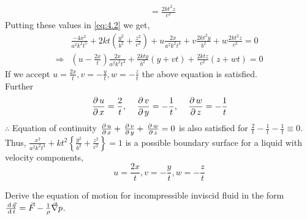 \documentclass[12pt]{article}
\begin{document}
\begin{soln}
\begin{align*}
        &=\frac{2kt^2z}{c^2}
    \end{align*}
    Putting these values in \eqref{eq:4.2} we get,
    \begin{align*}
        & \frac{-4 x^2}{a^2 k^2t^5}+2kt\left( \frac{y^2}{b^2}+\frac{z^2}{c^2} \right)+u \frac{2x}{a^2k^2t^4}+v \frac{2kt^2y}{b^2}+w\frac{2kt^2z}{c^2}=0\\
        \Rightarrow & \left( u-\frac{2x}{t} \right)\frac{2x}{a^2k^2t^4}+\frac{2kty}{b^2}(y+vt)+\frac{2ktz}{c^2}(z+wt)=0
    \end{align*}
    If we accept $ u=\frac{2x}{t},v=-\frac{y}{t},w=-\frac{z}{t} $ the above equation is satisfied.\\
    Further
    \[
        \,\frac{\partial\, u}{\partial\, x}=\frac{2}{t}, \quad \,\frac{\partial\, v}{\partial\, y}=-\frac{1}{t},\quad \,\frac{\partial\, w}{\partial\, z}=-\frac{1}{t}
    \]
    $ \therefore $ Equation of continuity $ \,\frac{\partial\, u}{\partial\, x}+\,\frac{\partial\, v}{\partial\, y}+\,\frac{\partial\, w}{\partial\, z}=0 $ is also satisfied for $ \frac{2}{t}-\frac{1}{t}-\frac{1}{t}\equiv 0 $.\\
    Thus, $ \frac{x^2}{a^2k^2t^4}+kt^2\left\{ \frac{y^2}{b^2} + \frac{z^2}{c^2} \right\}=1$ is a possible boundary surface for a liquid with velocity components,
    \[
        u=\frac{2x}{t},v=-\frac{y}{t},w=-\frac{z}{t}
    \]
\end{soln}
\newpage
\begin{prob}
    Derive the equation of motion for incompressible inviscid fluid in the form $ \frac{\,\mathrm{d}\,\vec{q}}{\,\mathrm{d}\, t}=\vec{F}-\frac{1}{\rho}\vec{\nabla} p $.
\end{prob}
\end{document}
